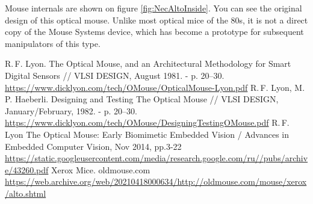 \documentclass[11pt, a4paper]{article}
\begin{document}
Mouse internals are shown on figure \ref{fig:NecAltoInside}. You can see the original design of this optical mouse. Unlike most optical mice of the 80s, it is not a direct copy of the Mouse Systems device, which has become a prototype for subsequent manipulators of this type.

\begin{thebibliography}{9}
 R.\,F. Lyon. The Optical Mouse, and an Architectural Methodology for
Smart Digital Sensors // VLSI DESIGN, August 1981. - p. 20--30. \url{https://www.dicklyon.com/tech/OMouse/OpticalMouse-Lyon.pdf}
 R.\,F. Lyon, M.\,P. Haeberli. Designing and Testing The Optical Mouse // VLSI DESIGN, January/February, 1982. - p. 20--30. \url{https://www.dicklyon.com/tech/OMouse/DesigningTestingOMouse.pdf}
 R.\,F. Lyon The Optical Mouse: Early Biomimetic Embedded Vision / Advances in Embedded Computer Vision, Nov 2014, pp.3-22 \url{https://static.googleusercontent.com/media/research.google.com/ru//pubs/archive/43260.pdf}
 Xerox Mice. oldmouse.com \url{https://web.archive.org/web/20210418000634/http://oldmouse.com/mouse/xerox/alto.shtml}
\end{thebibliography}
\end{document}
